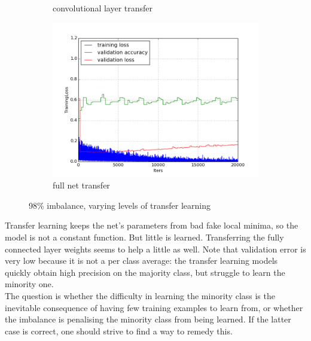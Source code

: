 \documentclass[a4paper,11pt]{article}
\begin{document}
\begin{figure}
\begin{minipage}[b]{\textwidth}
\begin{subfigure}{.5\textwidth}
        \caption{convolutional layer transfer}\label{fig:2b}
      \end{subfigure} \par \vspace*{3pt} %
      \begin{subfigure}{.5\textwidth} 
        \centering
        \includegraphics[scale=0.4]{images/plot_clampdetCI98_none_bs128_lr4.png}
        \caption{full net transfer}\label{fig:2b}
      \end{subfigure} \par \vspace*{3pt} %
      \caption{98\% imbalance, varying levels of transfer learning}\label{fig:2}
    \end{minipage}%
\end{figure}

Transfer learning keeps the net's parameters from bad fake local minima, so the model is not a constant function. But little is learned. Transferring the fully connected layer weights seems to help a little as well. Note that validation error is very low because it is not a per class average: the transfer learning models quickly obtain high precision on the majority class, but struggle to learn the minority one. \\

The question is whether the difficulty in learning the minority class is the inevitable consequence of having few training examples to learn from, or whether the imbalance is penalising the minority class from being learned. If the latter case is correct, one should strive to find a way to remedy this.  
\end{document}

